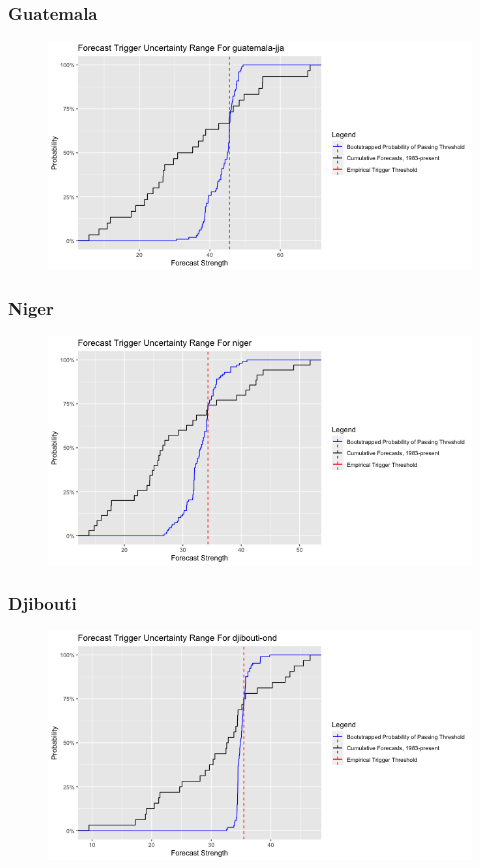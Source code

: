 \documentclass{ametsocV5}
\begin{document}
\subsubsection{Guatemala}

\begin{figure}
    \centering
    \includegraphics[width=0.9\linewidth]{figures/guatemala-jja.png}
\end{figure}

\subsubsection{Niger}

\begin{figure}
    \centering
    \includegraphics[width=0.9\linewidth]{figures/niger.png}
\end{figure}

\subsubsection{Djibouti}

\begin{figure}
    \centering
    \includegraphics[width=0.9\linewidth]{figures/djibouti-ond.png}
\end{figure}
\end{document}
